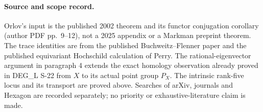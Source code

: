 \paragraph{Source and scope record.}
Orlov's input is the published 2002 theorem and its functor
conjugation corollary (author PDF pp.~9--12), not a 2025
appendix or a Markman preprint theorem. The trace identities
are from the published Buchweitz--Flenner paper and the
published equivariant Hochschild calculation of Perry.
The rational-eigenvector argument in paragraph 4 extends
the exact homology observation already proved in DEG\_L S-22
from $X$ to its actual point group $P_X$. The intrinsic
rank-five locus and its transport are proved above. Searches
of arXiv, journals and Hexagon are recorded separately; no
priority or exhaustive-literature claim is made.
